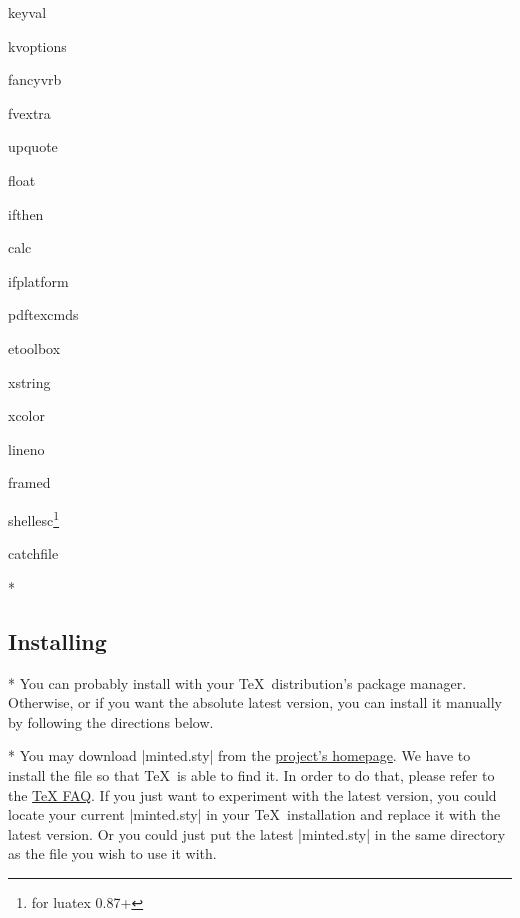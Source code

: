 \begin{multicols}{6}
\begingroup
\setlength\parskip{0pt}
\setlength\topsep{0pt}
\begin{list}{\textrm{}}{\ttfamily}
  \item keyval
  \item kvoptions
  \item fancyvrb
  \item fvextra
  \item upquote
  \item float
  \item ifthen
  \item calc
  \item ifplatform
  \item pdftexcmds
  \item etoolbox
  \item xstring
  \item xcolor
  \item lineno
  \item framed
  \item shellesc\footnote{for luatex 0.87+}
  \item catchfile
\end{list}
\endgroup
\end{multicols}

\begin{paracol}{2}
\switchcolumn[0]*%
\subsection{Installing }
\label{sec:installing:installing}

\switchcolumn
\switchcolumn[0]*%
You can probably install  with your \TeX\ distribution's package manager.  Otherwise, or if you want the absolute latest version, you can install it manually by following the directions below.

\switchcolumn
\switchcolumn[0]*%
You may download |minted.sty| from the
\href{https://github.com/gpoore/minted}{project's homepage}.  We have to install the file so that \TeX\ is able to find it.
In order to do that, please refer to the
\href{http://www.tex.ac.uk/cgi-bin/texfaq2html?label=inst-wlcf}{\TeX{} FAQ}.
If you just want to experiment with the latest version, you could locate your current |minted.sty| in your \TeX\ installation and replace it with the latest version.  Or you could just put the latest |minted.sty| in the same directory as the file you wish to use it with.

\end{paracol}